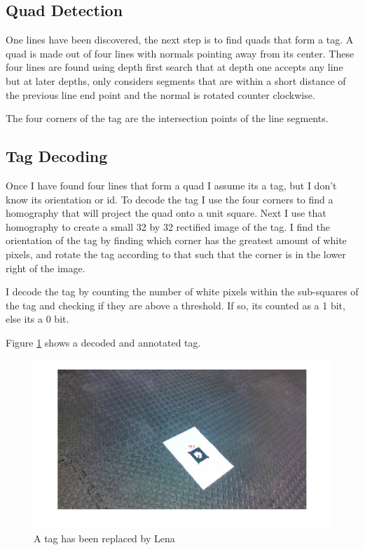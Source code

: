 \documentclass[12pt]{article}
\begin{document}
\subsection{Quad Detection}

One lines have been discovered, the next step is to find quads that form a tag. A quad is made out of four lines with normals pointing away from its center. These four lines are found using depth first search that at depth one accepts any line but at later depths, only considers segments that are within a short distance of the previous line end point and the normal is rotated counter clockwise.

The four corners of the tag are the intersection points of the line segments.

\subsection{Tag Decoding}

Once I have found four lines that form a quad I assume its a tag, but I don't know its orientation or id. To decode the tag I use the four corners to find a homography that will project the quad onto a unit square. Next I use that homography to create a small 32 by 32 rectified image of the tag. I find the orientation of the tag by finding which corner has the greatest amount of white pixels, and rotate the tag according to that such that the corner is in the lower right of the image.

I decode the tag by counting the number of white pixels within the sub-squares of the tag and checking if they are above a threshold. If so, its counted as a 1 bit, else its a 0 bit.

Figure \ref{fig_tag} shows a decoded and annotated tag.

\begin{figure}
    \center
    \includegraphics[width=\linewidth]{img/Tag}
    \caption{A tag has been replaced by Lena}
    \label{fig_tag}
\end{figure}
\end{document}
